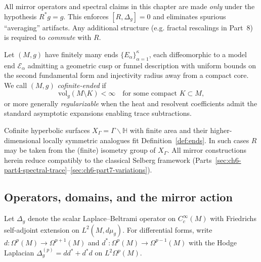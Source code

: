 \begin{remark}
\label{rem:R-isometry}
All mirror operators and spectral claims in this chapter are made \emph{only} under the hypothesis $R^*g=g$. This enforces $[R,\Delta_g]=0$ and eliminates spurious ``averaging'' artifacts. Any additional structure (e.g. fractal rescalings in Part~8) is required to \emph{commute} with $R$. %
\end{remark}

\begin{definition}
\label{def:ends}
Let $(M,g)$ have finitely many ends $\{E_\alpha\}_{\alpha=1}^\kappa$, each diffeomorphic to a model end $\mathcal{E}_\alpha$ admitting a geometric cusp or funnel description with uniform bounds on the second fundamental form and injectivity radius away from a compact core. We call $(M,g)$ \emph{cofinite-ended} if
\[
\mathrm{vol}_g(M\setminus K)<\infty\quad\text{for some compact }K\subset M,
\]
or more generally \emph{regularizable} when the heat and resolvent coefficients admit the standard asymptotic expansions enabling trace subtractions. %
\end{definition}

\begin{remark}
\label{rem:selberg-inside}
Cofinite hyperbolic surfaces $X_\Gamma=\Gamma\backslash\mathbb{H}$ with finite area and their higher-dimensional locally symmetric analogues fit Definition~\ref{def:ends}. In such cases $R$ may be taken from the (finite) isometry group of $X_\Gamma$. All mirror constructions herein reduce compatibly to the classical Selberg framework (Parts~\ref{sec:ch6-part4-spectral-trace}–\ref{sec:ch6-part7-variations}). %
\end{remark}

\subsection{Operators, domains, and the mirror action}
\label{subsec:ch6-part1-operators} \relax

\begin{definition}
\label{def:laplace-derham}
Let $\Delta_g$ denote the scalar Laplace–Beltrami operator on $C^\infty_c(M)$ with Friedrichs self-adjoint extension on $L^2(M,d\mu_g)$. For differential forms, write $d:\Omega^p(M)\to\Omega^{p+1}(M)$ and $d^*:\Omega^p(M)\to\Omega^{p-1}(M)$ with the Hodge Laplacian $\Delta_g^{(p)}=dd^*+d^*d$ on $L^2\Omega^p(M)$. %
\end{definition}

